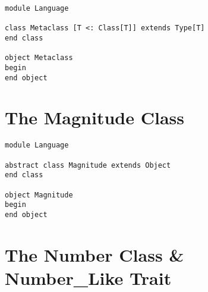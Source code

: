 \begin{lstlisting}
module Language

class Metaclass [T <: Class[T]] extends Type[T]
end class

object Metaclass
begin
end object
\end{lstlisting}






\section{The Magnitude Class}
\label{sec:lang-magnitude}

\begin{lstlisting}
module Language

abstract class Magnitude extends Object
end class

object Magnitude
begin
end object
\end{lstlisting}






\section{The Number Class \& Number\_Like Trait}
\label{sec:lang-number}

